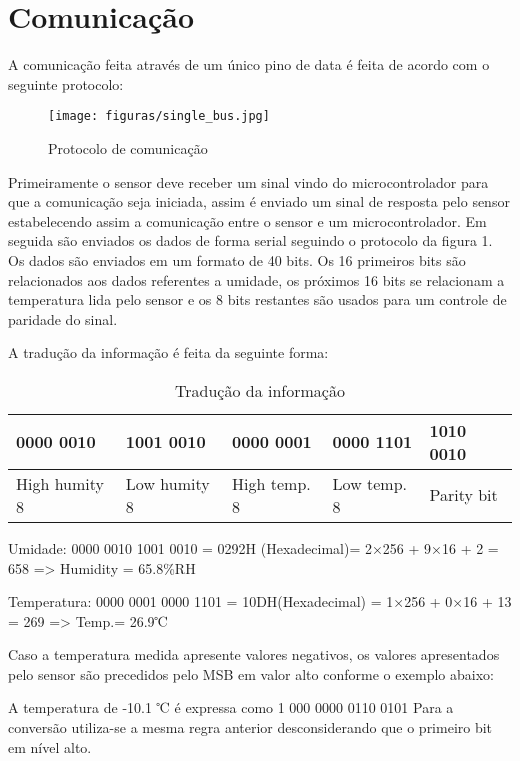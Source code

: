 \section{Comunicação}

A comunicação feita através de um único pino de data é feita de acordo com o seguinte protocolo:

\begin{figure}[H]
	\centering
	\texttt{[image: figuras/single\_bus.jpg]}
	\caption{Protocolo de comunicação} 
	\label{single_bus}
\end{figure}

Primeiramente o sensor deve receber um sinal vindo do microcontrolador para que a comunicação seja iniciada, assim é enviado um sinal de resposta pelo sensor estabelecendo assim a comunicação entre o sensor e um microcontrolador. Em seguida são enviados os dados de forma serial seguindo o protocolo da figura 1. Os  dados são enviados em um formato de 40 bits. Os 16 primeiros bits são relacionados aos dados referentes a umidade, os próximos 16 bits se relacionam a temperatura lida pelo sensor e os 8 bits restantes são usados para um controle de paridade do sinal\cite{liu2018}.

A tradução da informação é feita da seguinte forma:

\begin{table}[H]
	\centering
	\caption{Tradução da informação}
	\label{my-label}
	\begin{tabular}{|l|l|l|l|l|}
		\hline
		{0000 0010} & {1001 0010} & {0000 0001} & {0000 1101} & {1010 0010} \\ \hline
		High humity 8   & Low humity 8    & High temp. 8    & Low temp. 8     & Parity bit      \\ \hline
	\end{tabular}
\end{table}


Umidade: 0000 0010  1001 0010 = 0292H (Hexadecimal)= 2×256 + 9×16 + 2 = 658    => Humidity = 65.8\%RH

Temperatura: 0000 0001  0000 1101 = 10DH(Hexadecimal) = 1×256 + 0×16 + 13 = 269   => Temp.= 26.9℃ 

Caso a temperatura medida apresente valores negativos, os valores apresentados pelo sensor são precedidos pelo MSB em valor alto conforme o exemplo abaixo:

A temperatura de -10.1 ℃ é expressa como 1 000 0000 0110 0101
Para a conversão utiliza-se a mesma regra anterior desconsiderando que o primeiro bit em nível alto.

